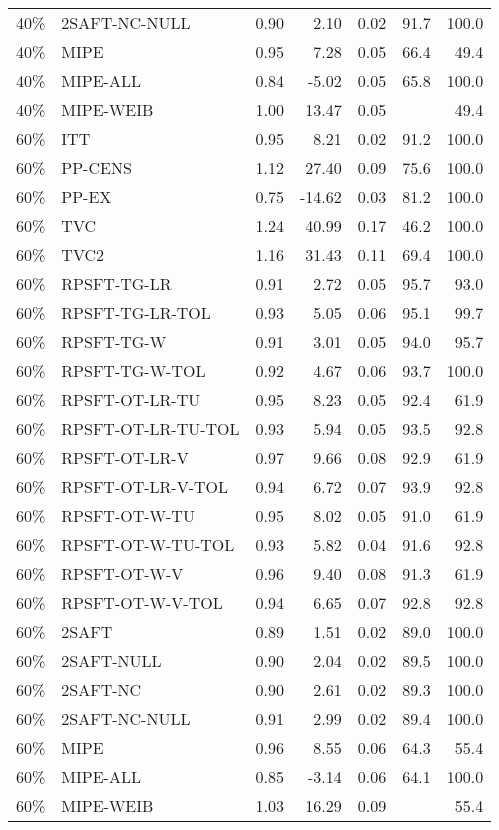 \begin{table}[ht]
{\begin{tabular}{llrrrrr}
  40\% & 2SAFT-NC-NULL & 0.90 & 2.10 & 0.02 & 91.7 & 100.0 \\ 
  40\% & MIPE & 0.95 & 7.28 & 0.05 & 66.4 & 49.4 \\ 
  40\% & MIPE-ALL & 0.84 & -5.02 & 0.05 & 65.8 & 100.0 \\ 
  40\% & MIPE-WEIB & 1.00 & 13.47 & 0.05 &  & 49.4 \\ 
   \hline
60\% & ITT & 0.95 & 8.21 & 0.02 & 91.2 & 100.0 \\ 
  60\% & PP-CENS & 1.12 & 27.40 & 0.09 & 75.6 & 100.0 \\ 
  60\% & PP-EX & 0.75 & -14.62 & 0.03 & 81.2 & 100.0 \\ 
  60\% & TVC & 1.24 & 40.99 & 0.17 & 46.2 & 100.0 \\ 
  60\% & TVC2 & 1.16 & 31.43 & 0.11 & 69.4 & 100.0 \\ 
   \hline
60\% & RPSFT-TG-LR & 0.91 & 2.72 & 0.05 & 95.7 & 93.0 \\ 
  60\% & RPSFT-TG-LR-TOL & 0.93 & 5.05 & 0.06 & 95.1 & 99.7 \\ 
  60\% & RPSFT-TG-W & 0.91 & 3.01 & 0.05 & 94.0 & 95.7 \\ 
  60\% & RPSFT-TG-W-TOL & 0.92 & 4.67 & 0.06 & 93.7 & 100.0 \\ 
  60\% & RPSFT-OT-LR-TU & 0.95 & 8.23 & 0.05 & 92.4 & 61.9 \\ 
  60\% & RPSFT-OT-LR-TU-TOL & 0.93 & 5.94 & 0.05 & 93.5 & 92.8 \\ 
  60\% & RPSFT-OT-LR-V & 0.97 & 9.66 & 0.08 & 92.9 & 61.9 \\ 
  60\% & RPSFT-OT-LR-V-TOL & 0.94 & 6.72 & 0.07 & 93.9 & 92.8 \\ 
   \hline
60\% & RPSFT-OT-W-TU & 0.95 & 8.02 & 0.05 & 91.0 & 61.9 \\ 
  60\% & RPSFT-OT-W-TU-TOL & 0.93 & 5.82 & 0.04 & 91.6 & 92.8 \\ 
  60\% & RPSFT-OT-W-V & 0.96 & 9.40 & 0.08 & 91.3 & 61.9 \\ 
  60\% & RPSFT-OT-W-V-TOL & 0.94 & 6.65 & 0.07 & 92.8 & 92.8 \\ 
   \hline
60\% & 2SAFT & 0.89 & 1.51 & 0.02 & 89.0 & 100.0 \\ 
  60\% & 2SAFT-NULL & 0.90 & 2.04 & 0.02 & 89.5 & 100.0 \\ 
  60\% & 2SAFT-NC & 0.90 & 2.61 & 0.02 & 89.3 & 100.0 \\ 
  60\% & 2SAFT-NC-NULL & 0.91 & 2.99 & 0.02 & 89.4 & 100.0 \\ 
  60\% & MIPE & 0.96 & 8.55 & 0.06 & 64.3 & 55.4 \\ 
  60\% & MIPE-ALL & 0.85 & -3.14 & 0.06 & 64.1 & 100.0 \\ 
  60\% & MIPE-WEIB & 1.03 & 16.29 & 0.09 &  & 55.4 \\ 
   \hline
\end{tabular}
}
\end{table}
